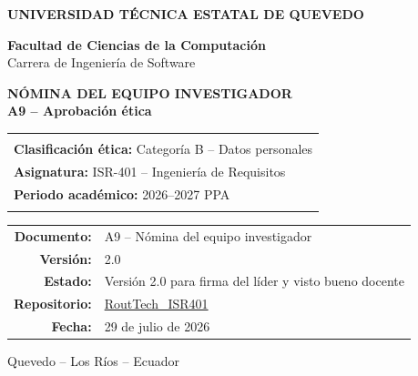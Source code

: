 \documentclass[11pt,a4paper]{article}
\newcommand{\Proyecto}{RoutTech: Sistema de Movilidad Colaborativa para la Comunidad Universitaria de la UTEQ}
\newcommand{\Asignatura}{ISR-401 -- Ingeniería de Requisitos}
\newcommand{\Periodo}{2026--2027 PPA}
\newcommand{\CategoriaEtica}{Categoría B -- Datos personales}
\newcommand{\Repositorio}{https://github.com/AnderJM3/RoutTech_ISR401}
\newcommand{\FechaDocumento}{29 de julio de 2026}
\newcommand{\VersionDocumento}{2.0}
\newcommand{\EstadoDocumento}{Versión 2.0 para firma del líder y visto bueno docente}
\begin{document}
\justifying

\thispagestyle{empty}

\vspace*{0.65cm}
\begin{center}
{\color{white}\Large\bfseries UNIVERSIDAD TÉCNICA ESTATAL DE QUEVEDO}

\vspace{1.75cm}
{\large\bfseries\color{RTForest} Facultad de Ciencias de la Computación\\[4pt]}
{\normalsize\color{RTGray} Carrera de Ingeniería de Software}

\vspace{0.85cm}

{\Huge\bfseries\color{RTForest} NÓMINA DEL EQUIPO INVESTIGADOR\\[8pt]}
{\Large\bfseries\color{RTTerracotta} A9 -- Aprobación ética}

\vspace{1.05cm}

\noindent\begin{tabularx}{0.90\textwidth}{@{}>{\centering\arraybackslash}X@{}}
\rowcolor{RTCream}
\addlinespace[5pt]
{\large\bfseries \Proyecto}\\[7pt]
\textbf{Clasificación ética:} \CategoriaEtica\\
\textbf{Asignatura:} \Asignatura\\
\textbf{Periodo académico:} \Periodo\\
\addlinespace[5pt]
\end{tabularx}

\vfill
\begin{tabular}{rl}
\textbf{Documento:} & A9 -- Nómina del equipo investigador\\
\textbf{Versión:} & \VersionDocumento\\
\textbf{Estado:} & \EstadoDocumento\\
\textbf{Repositorio:} & \href{\Repositorio}{RoutTech\_ISR401}\\
\textbf{Fecha:} & \FechaDocumento
\end{tabular}

\vspace{0.75cm}
{\small Quevedo -- Los Ríos -- Ecuador}
\end{center}
\clearpage
\end{document}
